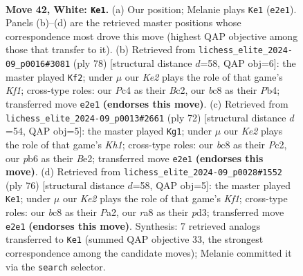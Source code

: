 \documentclass[11pt]{article}
\begin{document}
\clearpage

\begin{figure}[p]\centering
\begin{subfigure}{0.46\textwidth}\centering
\resizebox{\linewidth}{!}{%
\newchessgame
\chessboard[
  setfen={r1b3k1/p2p4/1pp5/5p1p/1PPPnP2/NB6/P3K2P/2R5 w - - 1 42},
  showmover=false,
  pgfstyle=straightmove, color=movearrow, markmove={e2-e1}
]}
\caption{}
\end{subfigure}\hfill
\begin{subfigure}{0.46\textwidth}\centering
\resizebox{\linewidth}{!}{%
\newchessgame
\chessboard[
  setfen={8/6kp/1n1p4/1p1Pp3/1Pp1P1Nn/2P1P2P/2B5/5K2 w - - 0 40},
  showmover=false,
  pgfstyle=straightmove, color=movearrow, markmove={f1-f2}
]}
\caption{}
\end{subfigure}
\\[4pt]
\begin{subfigure}{0.46\textwidth}\centering
\resizebox{\linewidth}{!}{%
\newchessgame
\chessboard[
  setfen={b4k2/7p/p2pp1p1/1p2n3/4P3/P1P4P/2PNB1P1/7K w - - 0 37},
  showmover=false,
  pgfstyle=straightmove, color=movearrow, markmove={h1-g1}
]}
\caption{}
\end{subfigure}\hfill
\begin{subfigure}{0.46\textwidth}\centering
\resizebox{\linewidth}{!}{%
\newchessgame
\chessboard[
  setfen={5k2/1p6/p1nP2p1/3B1bpp/1P6/2Bp2P1/P4P1P/5K2 w - - 3 39},
  showmover=false,
  pgfstyle=straightmove, color=movearrow, markmove={f1-e1}
]}
\caption{}
\end{subfigure}
\caption{\textbf{Move 42, White: \texttt{Ke1}.} (a) Our position; Melanie plays \texttt{Ke1} (\texttt{e2e1}). Panels (b)--(d) are the retrieved master positions whose correspondence most drove this move (highest QAP objective among those that transfer to it). (b) Retrieved from \texttt{lichess\_elite\_2024-09\_p0016\#3081} (ply 78) [structural distance $d$=58, QAP obj=6]: the master played \texttt{Kf2}; under $\mu$ our \emph{Ke2} plays the role of that game's \emph{Kf1}; cross-type roles: our \emph{P}c4 as their \emph{B}c2, our \emph{b}c8 as their \emph{P}b4; transferred move \texttt{e2e1} \textbf{(endorses this move)}. (c) Retrieved from \texttt{lichess\_elite\_2024-09\_p0013\#2661} (ply 72) [structural distance $d$=54, QAP obj=5]: the master played \texttt{Kg1}; under $\mu$ our \emph{Ke2} plays the role of that game's \emph{Kh1}; cross-type roles: our \emph{b}c8 as their \emph{P}c2, our \emph{p}b6 as their \emph{B}e2; transferred move \texttt{e2e1} \textbf{(endorses this move)}. (d) Retrieved from \texttt{lichess\_elite\_2024-09\_p0028\#1552} (ply 76) [structural distance $d$=58, QAP obj=5]: the master played \texttt{Ke1}; under $\mu$ our \emph{Ke2} plays the role of that game's \emph{Kf1}; cross-type roles: our \emph{b}c8 as their \emph{P}a2, our \emph{r}a8 as their \emph{p}d3; transferred move \texttt{e2e1} \textbf{(endorses this move)}. Synthesis: 7 retrieved analogs transferred to \texttt{Ke1} (summed QAP objective 33, the strongest correspondence among the candidate moves); Melanie committed it via the \texttt{search} selector.}
\label{fig:thought-m82}
\end{figure}
\end{document}

